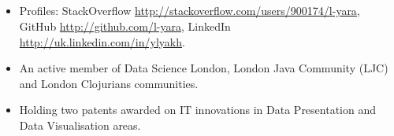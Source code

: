 \documentclass{res}
\newcommand{\osection}[1]{\section{\sc {\Large \textbf{#1}\\}} \vspace{0.30cm}}
\newif\ifFullVersion
\begin{document}
\begin{resume}
\osection{SPECIALS}
\vspace{0.20cm}
\begin{itemize}
 \item Profiles: StackOverflow \url{http://stackoverflow.com/users/900174/l-yara}, GitHub \url{http://github.com/l-yara}, LinkedIn \url{http://uk.linkedin.com/in/ylyakh}.
 \item An active member of Data Science London, London Java Community (LJC) and London Clojurians communities.
\ifFullVersion
 \item Sports: volleyball (former player of ``CBPhoto'' Irish Division 1 team, now playing in Kent amateur league), sailing (former pupil of Kiev Olympic School).
\else
\item Holding two patents awarded on IT innovations in Data Presentation and Data Visualisation areas.
\fi
\end{itemize}


\end{resume}
\end{document}
